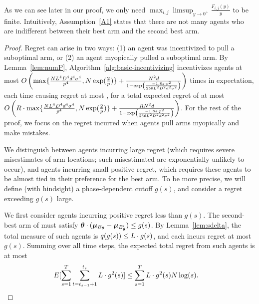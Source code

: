 As we can see later in our proof, we only need
$\max_{i,j}\limsup_{y\rightarrow 0^{+}}\frac{F_{i,j}(y)}{y}$ to be
finite.
Intuitively, Assumption~\ref{A1} states that there are not many agents
who are indifferent between their best arm and the second best arm.


\begin{proof}
Regret can arise in two ways:
(1) an agent was incentivized to pull a suboptimal arm, or
(2) an agent myopically pulled a suboptimal arm.
By Lemma~\ref{lem:numP}, Algorithm~\ref{alg:basic-incentivizing}
incentivizes agents at most 
$O \left( \max\{\frac{N L^4 D^4 d^4 \sigma^4}{p^4}, N\exp(\frac{2}{p})\}
  + \frac{N^2 d}{1 - \exp \left(
    \frac{-1.8 s \cdot p^2}{256 L^2 D^2 d^2 \sigma^2}
  \right)} \right)$
times in expectation, each time causing regret at most \MAXR,
for a total expected regret of at most
$O \left(R\cdot\max\{\frac{N L^4 D^4 d^4 \sigma^4}{p^4}, N\exp(\frac{2}{p})\}
  + \frac{R N^2 d}{1 - \exp \left(
    \frac{-1.8 s \cdot p^2}{256 L^2 D^2 d^2 \sigma^2}
  \right)} \right)$.
For the rest of the proof, we focus on the regret incurred when agents
pull arms myopically and make mistakes.

We distinguish between agents incurring large regret
(which requires severe misestimates of arm locations;
such misestimated are exponentially unlikely to occur), 
and agents incurring small positive regret,
which requires these agents to be almost tied in their preference for
the best arm.
To be more precise, we will define (with hindsight) a phase-dependent
cutoff $g(s)$, and consider a regret exceeding $g(s)$ large.

We first consider agents \AgV incurring positive regret less than $g(s)$.
The second-best arm \Second{\AgV} of \AgV must satisfy
$\bm{\theta} \cdot (\bm{\mu}_{B_{\bm{\theta}}} - \bm{\mu}_{B'_{\bm{\theta}}}) \leq g(s)$.
By Lemma~\ref{lem:sdelta}, the total measure of such agents
is $q(g(s)) \leq L \cdot g(s)$,
and each incurs regret at most $g(s)$.
Summing over all time steps, the expected total regret from such agents is at most
\begin{align}
&E[\sum_{s=1}^{T}\sum_{t=t_{s-1}+1}^{t_{s}} L \cdot g^2(s)] \leq \sum_{s=1}^{T}L\cdot g^2(s)N\log(s). \nonumber 
\end{align}


\end{proof}
